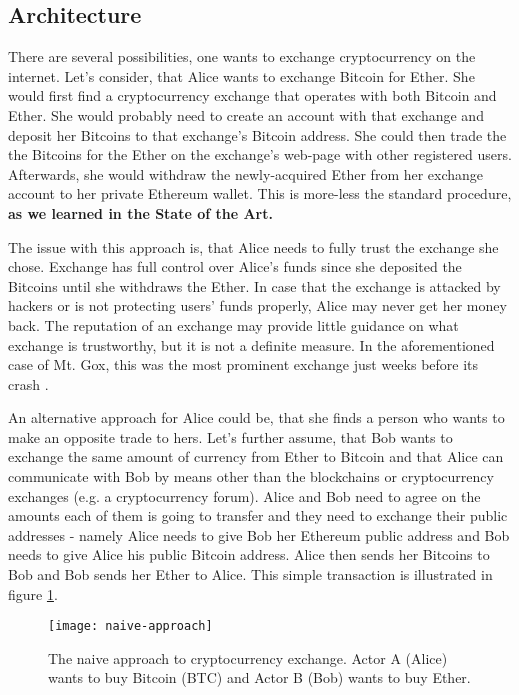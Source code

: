 \subsection{Architecture}
% 
There are several possibilities, one wants to exchange cryptocurrency on the internet. Let's consider, that Alice wants to exchange Bitcoin for Ether. She would first find a cryptocurrency exchange that operates with both Bitcoin and Ether. She would probably need to create an account with that exchange and deposit her Bitcoins to that exchange's Bitcoin address. She could then trade the the Bitcoins for the Ether on the exchange's web-page with other registered users. Afterwards, she would withdraw the newly-acquired Ether from her exchange account to her private Ethereum wallet. This is more-less the standard procedure, \textbf{as we learned in the State of the Art.}

The issue with this approach is, that Alice needs to fully trust the exchange she chose. Exchange has full control over Alice's funds since she deposited the Bitcoins until she withdraws the Ether. In case that the exchange is attacked by hackers or is not protecting users' funds properly, Alice may never get her money back. The reputation of an exchange may provide little guidance on what exchange is trustworthy, but it is not a definite measure. In the aforementioned case of Mt. Gox, this was the most prominent exchange just weeks before its crash \cite{Popper2014ApparentTimes}.

An alternative approach for Alice could be, that she finds a person who wants to make an opposite trade to hers. Let's further assume, that Bob wants to exchange the same amount of currency from Ether to Bitcoin and that Alice can communicate with Bob by means other than the blockchains or cryptocurrency exchanges (e.g. a cryptocurrency forum). Alice and Bob need to agree on the amounts each of them is going to transfer and they need to exchange their public addresses - namely Alice needs to give Bob her Ethereum public address and Bob needs to give Alice his public Bitcoin address. Alice then sends her Bitcoins to Bob and Bob sends her Ether to Alice. This simple transaction is illustrated in figure \ref{fig:naive-approach}.

\begin{figure}[ht]
    \centering
    \texttt{[image: naive-approach]}
    \caption{The naive approach to cryptocurrency exchange. Actor A (Alice) wants to buy Bitcoin (BTC) and Actor B (Bob) wants to buy Ether. }
    \label{fig:naive-approach}
\end{figure}

